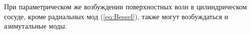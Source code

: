 
%
%
%
%
%
%
%
При параметрическом же возбуждении поверхностных волн в цилиндрическом сосуде, кроме радиальных мод (\ref{eq:Bessel}), также могут возбуждаться и азимутальные моды.
%
%
%

